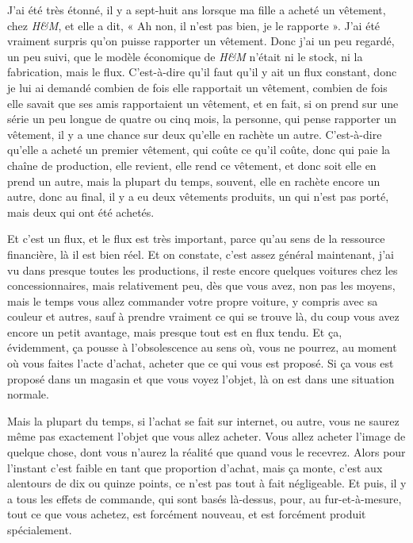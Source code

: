 \begin{small}
\smallbreak
J'ai été très étonné, il y a sept-huit ans lorsque ma fille a acheté un vêtement, chez \textit{H\&M}, et elle a dit, « Ah non, il n'est pas bien, je le rapporte ». J'ai été vraiment surpris qu'on puisse rapporter un vêtement. Donc j'ai un peu regardé, un peu suivi, que le modèle économique de \textit{H\&M} n'était ni le stock, ni la fabrication, mais le flux. C'est-à-dire qu'il faut qu'il y ait un flux constant, donc je lui ai demandé combien de fois elle rapportait un vêtement, combien de fois elle savait que ses amis rapportaient un vêtement, et en fait, si on prend sur une série un peu longue de quatre ou cinq mois, la personne, qui pense rapporter un vêtement, il y a une chance sur deux qu'elle en rachète un autre. C'est-à-dire qu'elle a acheté un premier vêtement, qui coûte ce qu'il coûte, donc qui paie la chaîne de production, elle revient, elle rend ce vêtement, et donc soit elle en prend un autre, mais la plupart du temps, souvent, elle en rachète encore un autre, donc au final, il y a eu deux vêtements produits, un qui n'est pas porté, mais deux qui ont été achetés. 

\smallbreak
Et c'est un flux, et le flux est très important, parce qu’au sens de la ressource financière, là il est bien réel. Et on constate, c'est assez général maintenant, j'ai vu dans presque toutes les productions, il reste encore quelques voitures chez les concessionnaires, mais relativement peu, dès que vous avez, non pas les moyens, mais le temps vous allez commander votre propre voiture, y compris avec sa couleur et autres, sauf à prendre vraiment ce qui se trouve là, du coup vous avez encore un petit avantage, mais presque tout est en flux tendu. Et ça, évidemment, ça pousse à l'obsolescence au sens où, vous ne pourrez, au moment où vous faites l'acte d'achat, acheter que ce qui vous est proposé. Si ça vous est proposé dans un magasin et que vous voyez l'objet, là on est dans une situation normale. 

Mais la plupart du temps, si l'achat se fait sur internet, ou autre, vous ne saurez même pas exactement l'objet que vous allez acheter. Vous allez acheter l'image de quelque chose, dont vous n'aurez la réalité que quand vous le recevrez. Alors pour l'instant c'est faible en tant que proportion d'achat, mais ça monte, c'est aux alentours de dix ou quinze points, ce n'est pas tout à fait négligeable. Et puis, il y a tous les effets de commande, qui sont basés là-dessus, pour, au fur-et-à-mesure, tout ce que vous achetez, est forcément nouveau, et est forcément produit spécialement. 


\end{small}
